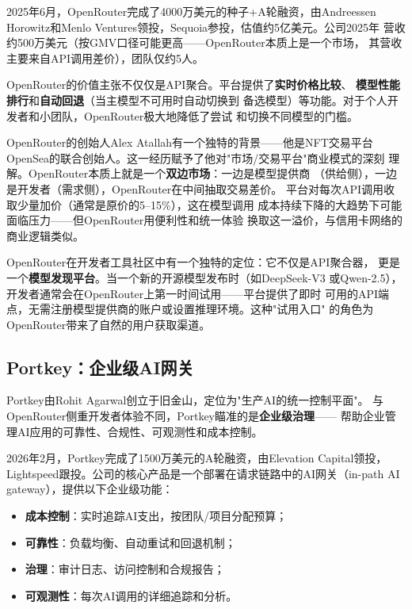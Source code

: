 2025年6月，OpenRouter完成了4000万美元的种子+A轮融资，由Andreessen
Horowitz和Menlo Ventures领投，Sequoia参投，估值约5亿美元。公司2025年
营收约500万美元（按GMV口径可能更高——OpenRouter本质上是一个市场，
其营收主要来自API调用差价），团队仅约5人。

OpenRouter的价值主张不仅仅是API聚合。平台提供了\textbf{实时价格比较}、
\textbf{模型性能排行}和\textbf{自动回退}（当主模型不可用时自动切换到
备选模型）等功能。对于个人开发者和小团队，OpenRouter极大地降低了尝试
和切换不同模型的门槛。

OpenRouter的创始人Alex Atallah有一个独特的背景——他是NFT交易平台
OpenSea的联合创始人。这一经历赋予了他对"市场/交易平台"商业模式的深刻
理解。OpenRouter本质上就是一个\textbf{双边市场}：一边是模型提供商
（供给侧），一边是开发者（需求侧），OpenRouter在中间抽取交易差价。
平台对每次API调用收取少量加价（通常是原价的5--15\%），这在模型调用
成本持续下降的大趋势下可能面临压力——但OpenRouter用便利性和统一体验
换取这一溢价，与信用卡网络的商业逻辑类似。

OpenRouter在开发者工具社区中有一个独特的定位：它不仅是API聚合器，
更是一个\textbf{模型发现平台}。当一个新的开源模型发布时（如DeepSeek-V3
或Qwen-2.5），开发者通常会在OpenRouter上第一时间试用——平台提供了即时
可用的API端点，无需注册模型提供商的账户或设置推理环境。这种"试用入口"
的角色为OpenRouter带来了自然的用户获取渠道。

\subsection{Portkey：企业级AI网关}
\label{subsec:portkey}

Portkey由Rohit Agarwal创立于旧金山，定位为"生产AI的统一控制平面"。
与OpenRouter侧重开发者体验不同，Portkey瞄准的是\textbf{企业级治理}——
帮助企业管理AI应用的可靠性、合规性、可观测性和成本控制。

2026年2月，Portkey完成了1500万美元的A轮融资，由Elevation Capital领投，
Lightspeed跟投。公司的核心产品是一个部署在请求链路中的AI网关（in-path
AI gateway），提供以下企业级功能：
\begin{itemize}
  \item \textbf{成本控制}：实时追踪AI支出，按团队/项目分配预算；
  \item \textbf{可靠性}：负载均衡、自动重试和回退机制；
  \item \textbf{治理}：审计日志、访问控制和合规报告；
  \item \textbf{可观测性}：每次AI调用的详细追踪和分析。
\end{itemize}

